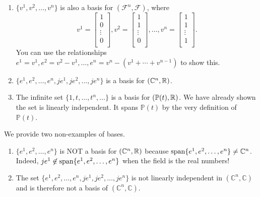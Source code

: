 \begin{example}
\begin{enumerate}
    
    \item $\{v^1,v^2,\dots,v^n\}$ is also a basis for $(\mathcal{F}^n,\mathcal{F})$, where
     $$v^1=\begin{bmatrix}
    1\\
    0\\
    \vdots\\
    0\\
    \end{bmatrix}, v^2=\begin{bmatrix}
    1\\
    1\\
    \vdots\\
    0\\
    \end{bmatrix}, \ldots, v^n=\begin{bmatrix}
    1\\
    1\\
    \vdots\\
    1\\
    \end{bmatrix}.$$
    You can use the relationships $e^1 = v^1, e^2 = v^2 - v^1, \ldots, e^n = v^n - (v^1 + \cdots + v^{n-1})$ to show this. 
   
     
     \item $\{e^1,e^2,\ldots,e^n,je^1,je^2,\ldots,je^n\}$ is a basis for  $(\mathbb{C}^n,\mathbb R)$.  
   
   \item  The infinite set $\{1,t,\dots,t^n,\dots\}$ is a basis for $(\mathbb{P}(t),\mathbb R)$. We have already shown the set is linearly independent. It spans $\mathbb{P}(t)$ by the very definition of $\mathbb{P}(t)$.
    \end{enumerate}
    \end{example}

\begin{example}
We provide two non-examples of bases.
\begin{enumerate}
        \renewcommand{\labelenumi}{(\alph{enumi})}
        \setlength{\itemsep}{.1cm}
        
        \item $\{e^1,e^2,\ldots,e^n\}$ is NOT a basis for $(\mathbb{C}^n,\mathbb R)$ because $\mathrm{span} \{ e^1,e^2,\ldots,e^n \} \neq \mathbb{C}^n$. Indeed, $je^1 \not \in \mathrm{span} \{ e^1,e^2,\ldots,e^n \}$ when the field is the real numbers!
    \item The set $\{e^1,e^2,\ldots,e^n,je^1,je^2,\ldots,je^n\}$ is not linearly independent in $(\mathbb{C}^n,\mathbb{C})$ and is therefore not a basis of $(\mathbb{C}^n,\mathbb{C})$.
    \end{enumerate}
\end{example}    

